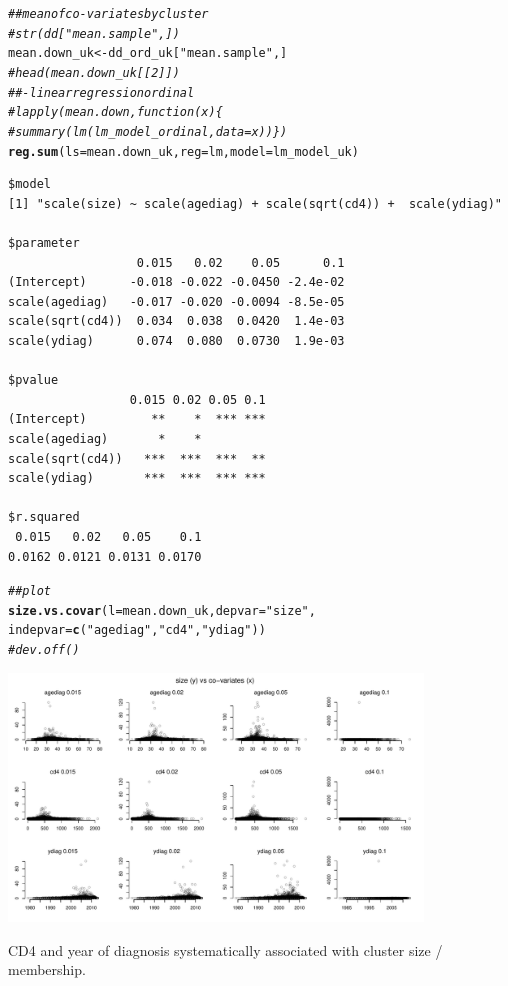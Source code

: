 \documentclass[]{revtex4}\usepackage[]{graphicx}\usepackage[]{color}
\makeatletter
\newcommand{\hlstr}[1]{\textcolor[rgb]{0.192,0.494,0.8}{#1}}%
\newcommand{\hlcom}[1]{\textcolor[rgb]{0.678,0.584,0.686}{\textit{#1}}}%
\newcommand{\hlstd}[1]{\textcolor[rgb]{0.345,0.345,0.345}{#1}}%
\newcommand{\hlkwb}[1]{\textcolor[rgb]{0.69,0.353,0.396}{#1}}%
\newcommand{\hlkwc}[1]{\textcolor[rgb]{0.333,0.667,0.333}{#1}}%
\newcommand{\hlkwd}[1]{\textcolor[rgb]{0.737,0.353,0.396}{\textbf{#1}}}%
\newenvironment{kframe}{%
 \def\at@end@of@kframe{}%
 \ifinner\ifhmode%
  \def\at@end@of@kframe{\end{minipage}}%
  \begin{minipage}{\columnwidth}%
 \fi\fi%
 \def\FrameCommand##1{\hskip\@totalleftmargin \hskip-\fboxsep
 \colorbox{shadecolor}{##1}\hskip-\fboxsep
     \hskip-\linewidth \hskip-\@totalleftmargin \hskip\columnwidth}%
 \MakeFramed {\advance\hsize-\width
   \@totalleftmargin\z@ \linewidth\hsize
   \@setminipage}}%
 {\par\unskip\endMakeFramed%
 \at@end@of@kframe}
\newenvironment{knitrout}{}{} %
\makeatother
\begin{document}
\begin{knitrout}
\color{fgcolor}\begin{kframe}
\begin{alltt}
\hlcom{## mean of co-variates by cluster}
\hlcom{# str(dd["mean.sample",])}
\hlstd{mean.down_uk} \hlkwb{<-} \hlstd{dd_ord_uk[}\hlstr{"mean.sample"}\hlstd{,]}
\hlcom{# head(mean.down_uk[[2]])}
\hlcom{##- linear regression ordinal}
\hlcom{#    lapply(mean.down, function(x) \{}
\hlcom{#    summary(lm(lm_model_ordinal, data = x))\})}
\hlkwd{reg.sum}\hlstd{(}\hlkwc{ls} \hlstd{= mean.down_uk,} \hlkwc{reg} \hlstd{= lm,} \hlkwc{model} \hlstd{= lm_model_uk)}
\end{alltt}
\begin{verbatim}
$model
[1] "scale(size) ~ scale(agediag) + scale(sqrt(cd4)) +  scale(ydiag)"

$parameter
                  0.015   0.02    0.05      0.1
(Intercept)      -0.018 -0.022 -0.0450 -2.4e-02
scale(agediag)   -0.017 -0.020 -0.0094 -8.5e-05
scale(sqrt(cd4))  0.034  0.038  0.0420  1.4e-03
scale(ydiag)      0.074  0.080  0.0730  1.9e-03

$pvalue
                 0.015 0.02 0.05 0.1
(Intercept)         **    *  *** ***
scale(agediag)       *    *         
scale(sqrt(cd4))   ***  ***  ***  **
scale(ydiag)       ***  ***  *** ***

$r.squared
 0.015   0.02   0.05    0.1 
0.0162 0.0121 0.0131 0.0170 
\end{verbatim}
\begin{alltt}
\hlcom{## plot}
\hlkwd{size.vs.covar}\hlstd{(}\hlkwc{l} \hlstd{= mean.down_uk,} \hlkwc{depvar} \hlstd{=} \hlstr{"size"}\hlstd{,}
\hlkwc{indepvar} \hlstd{=} \hlkwd{c}\hlstd{(}\hlstr{"agediag"}\hlstd{,} \hlstr{"cd4"}\hlstd{,} \hlstr{"ydiag"}\hlstd{))}
\hlcom{# dev.off()}
\end{alltt}
\end{kframe}

{\centering \includegraphics[width=11cm]{figure/plotrun_down-sample_UK_2-1} 

}



\end{knitrout}
CD4 and year of diagnosis systematically associated with cluster size / membership. 
\end{document}
